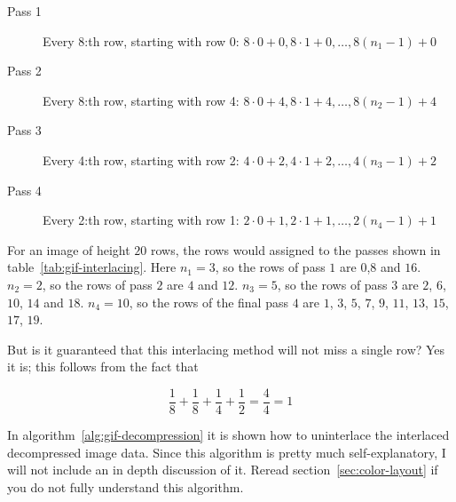 \newcommand{\passrows}[3]{$#1 \cdot 0 + #2, #1 \cdot 1 + #2, \dots,
  #1(n_{#3}-1) + #2$}

\begin{description}
\item[Pass 1] Every 8:th row, starting with row 0: \passrows{8}{0}{1}
\item[Pass 2] Every 8:th row, starting with row 4: \passrows{8}{4}{2}
\item[Pass 3] Every 4:th row, starting with row 2: \passrows{4}{2}{3}
\item[Pass 4] Every 2:th row, starting with row 1: \passrows{2}{1}{4}
\end{description}

For an image of height $20$ rows, the rows would assigned to the
passes shown in table~\ref{tab:gif-interlacing}. Here $n_1 =
3$, so the rows of pass $1$ are $0$,$8$ and $16$. $n_2 = 2$, so the
rows of pass $2$ are $4$ and $12$. $n_3 = 5$, so the rows of pass $3$
are $2$, $6$, $10$, $14$ and $18$. $n_4 = 10$, so the rows of the
final pass $4$ are $1$, $3$, $5$, $7$, $9$, $11$, $13$, $15$, $17$,
$19$.

But is it guaranteed that this interlacing method will not miss a single
row? Yes it is; this follows from the fact that

\begin{equation*}
  \frac{1}{8} + \frac{1}{8} + \frac{1}{4} + \frac{1}{2} = \frac{4}{4}
  = 1
\end{equation*}

In algorithm~\ref{alg:gif-decompression} it is shown how to
uninterlace the interlaced decompressed image data.  Since this
algorithm is pretty much self-explanatory, I will not include an in
depth discussion of it. Reread section~\ref{sec:color-layout} if you
do not fully understand this algorithm.

